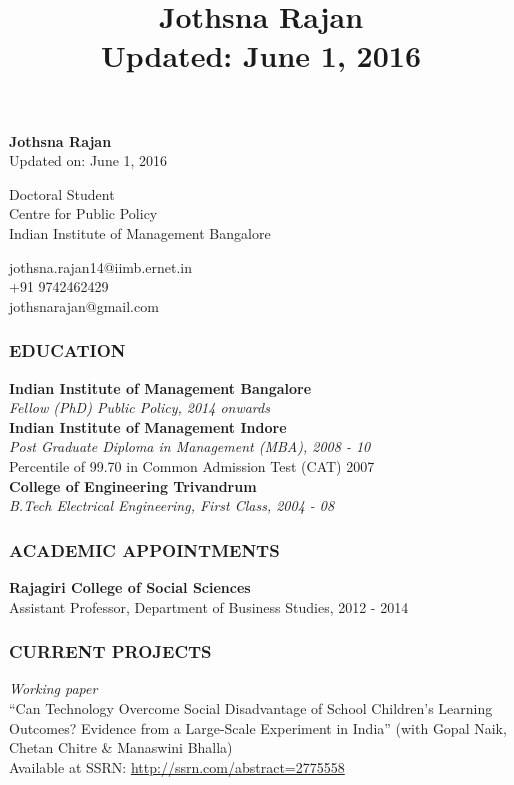 \documentclass[12pt, a4paper]{article}
\title{\textbf{Jothsna Rajan \\ \small{Updated: June 1, 2016} }}
\date{}
\begin{document}
	\begin{center}
		\large{\textbf{Jothsna Rajan}} \\
		\small{Updated on: June 1, 2016}
	\end{center}
	\begin{multicols}{2}
		\begin{flushleft}
			\noindent Doctoral Student \\
			Centre for Public Policy \\
			Indian Institute of Management Bangalore \\
		\end{flushleft}
		\begin{flushright}
			\noindent jothsna.rajan14@iimb.ernet.in \\
			+91 9742462429 \\
			jothsnarajan@gmail.com \\
		\end{flushright}
	\end{multicols}
	\subsubsection*{EDUCATION}
	
	\noindent\textbf{Indian Institute of Management Bangalore} \\
	\textit{Fellow (PhD) Public Policy, 2014 onwards} \\
	
	\noindent\textbf{Indian Institute of Management Indore} \\
	\textit{Post Graduate Diploma in Management (MBA), 2008 - 10} \\
	Percentile of 99.70 in Common Admission Test (CAT) 2007 \\
	
	\noindent\textbf{College of Engineering Trivandrum} \\
	\textit{B.Tech Electrical Engineering, First Class, 2004 - 08}
	
	\subsubsection*{ACADEMIC APPOINTMENTS}
		\noindent\textbf{Rajagiri College of Social Sciences} \\
		Assistant Professor, Department of Business Studies, 2012 - 2014 
	\subsubsection*{CURRENT PROJECTS}
		\noindent \textit{Working paper} \\
		``Can Technology Overcome Social Disadvantage of School Children's Learning Outcomes? Evidence from a Large-Scale Experiment in India'' (with Gopal Naik, Chetan Chitre \& Manaswini Bhalla) \\ Available at SSRN: \url{http://ssrn.com/abstract=2775558} 
\end{document}
